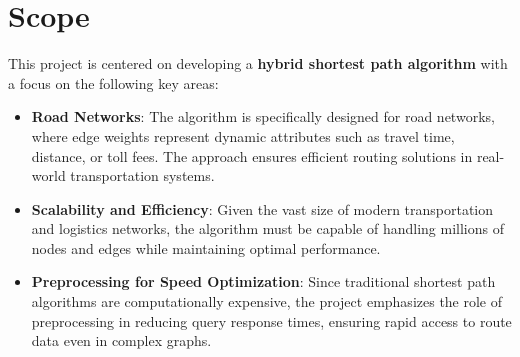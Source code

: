 	\section{Scope}
	This project is centered on developing a \textbf{hybrid shortest path algorithm} with a focus on the following key areas:
	\begin{itemize}
		\item \textbf{Road Networks}: The algorithm is specifically designed for road networks, where edge weights represent dynamic attributes such as travel time, distance, or toll fees. The approach ensures efficient routing solutions in real-world transportation systems.
		\item \textbf{Scalability and Efficiency}: Given the vast size of modern transportation and logistics networks, the algorithm must be capable of handling millions of nodes and edges while maintaining optimal performance.
		\item \textbf{Preprocessing for Speed Optimization}: Since traditional shortest path algorithms are computationally expensive, the project emphasizes the role of preprocessing in reducing query response times, ensuring rapid access to route data even in complex graphs.
	\end{itemize}


